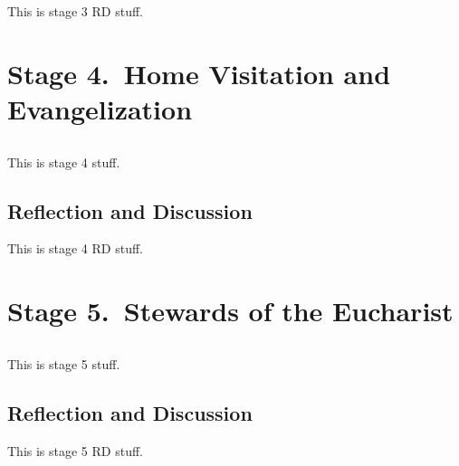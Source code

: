 \documentclass[oneside]{book}
\begin{document}
This is stage 3 RD stuff.


\chapter{Stage 4.\ Home Visitation and Evangelization}

\section*{} 

This is stage 4 stuff.


\section{Reflection and Discussion}

This is stage 4 RD stuff.


\chapter{Stage 5.\ Stewards of the Eucharist}

\section*{} 

This is stage 5 stuff.


\section{Reflection and Discussion}

This is stage 5 RD stuff.


\end{document}
